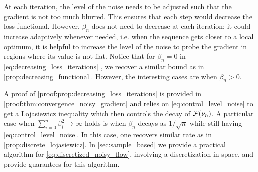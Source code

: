 \begin{remark}
	At each iteration, the level of the noise needs to be adjusted such that the gradient is not too much blurred. This ensures that each step would decrease the loss functional. However, $\beta_n$ does not need to decrease at each iteration: it could increase adaptively whenever needed, i.e. when  the sequence gets closer to a local optimum, it is helpful to increase the level of the noise to probe the gradient in regions where its value is not flat.
	Notice that for $\beta_n = 0$  in \cref{eq:decreasing_loss_iterations} , we recover a similar bound as in \cref{prop:decreasing_functional}. However, the interesting cases are when $\beta_n>0$.
 \end{remark}
A proof of \cref{proof:prop:decreasing_loss_iterations} is provided in \cref{proof:thm:convergence_noisy_gradient} and relies on \cref{eq:control_level_noise} to get a Lojasiewicz inequality which then controls the decay of ${{\mathcal F}}(\nu_n)$. A particular case when $\sum_{i=0}^n \beta_i^2 \rightarrow \infty$ holds is when $\beta_n$ decays as $1/\sqrt{n}$ while still having \cref{eq:control_level_noise}. In this case, one recovers similar rate as in \cref{prop:discrete_lojasiewicz}.
In \cref{sec:sample_based} we provide a practical algorithm for \cref{eq:discretized_noisy_flow}, involving a discretization in space, and provide guarantees for this algorithm.
 
 
 
